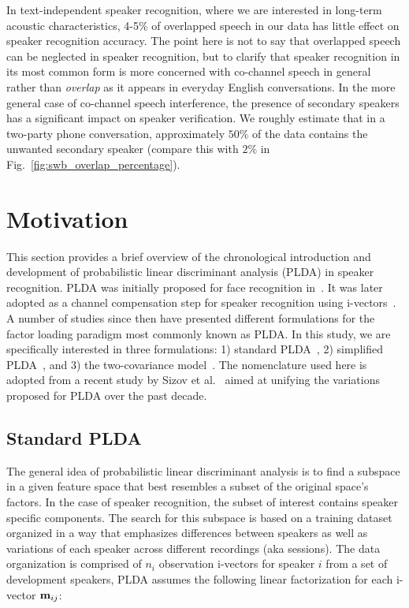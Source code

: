 \documentclass[journal]{IEEEtran}
\begin{document}
In text-independent speaker recognition, where we are interested in long-term acoustic characteristics, 4-5\% of overlapped speech in our data has little effect on speaker recognition accuracy. The point here is not to say that overlapped speech can be neglected in speaker recognition, but to clarify that speaker recognition in its most common form is more concerned with co-channel speech in general rather than {\it overlap} as it appears in everyday English conversations. 
In the more general case of co-channel speech interference, the presence of secondary speakers has a significant impact on speaker verification. 
We roughly estimate that in a two-party phone conversation, approximately $50\%$ of the data contains the unwanted secondary speaker (compare this with $2\%$ in Fig.~\ref{fig:swb_overlap_percentage}). 


\section{Motivation}
\label{sec:background}
This section provides a brief overview of the chronological introduction and development of probabilistic linear discriminant analysis (PLDA) in speaker recognition. 
PLDA was initially proposed for face recognition in~\cite{prince_plda}. 
It was later adopted as a channel compensation step for speaker recognition using i-vectors~\cite{kenny2010bayesian}. 
A number of studies since then have presented different formulations for the factor loading paradigm most commonly known as PLDA. 
In this study, we are specifically interested in three formulations: 1) standard PLDA~\cite{kenny_plda}, 2) simplified PLDA~\cite{kenny_plda2,Daniel2011is}, and 3) the two-covariance model~\cite{brummer2010twocov}. 
The nomenclature used here is adopted from a recent study by Sizov et al.~\cite{sizov2014unifying} aimed at unifying the variations proposed for PLDA over the past decade. 


\subsection{Standard PLDA}
\label{ssec:standard_plda}
The general idea of probabilistic linear discriminant analysis is to find a subspace in a given feature space that best resembles a subset of the original space's factors. 
In the case of speaker recognition, the subset of interest contains speaker specific components. 
The search for this subspace is based on a training dataset organized in a way that emphasizes differences between speakers as well as variations of each speaker across different recordings (aka sessions). 
The data organization is comprised of $n_i$ observation i-vectors for speaker $i$ from a set of development speakers, PLDA assumes the following linear factorization for each i-vector ${\bf m}_{ij}$: 
\end{document}
